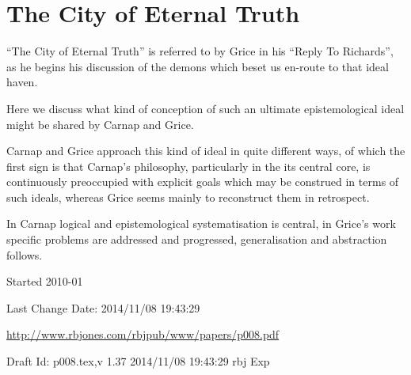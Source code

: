\documentclass[10pt,titlepage]{book}
\begin{document}
\chapter{The City of Eternal Truth}


``The City of Eternal Truth'' is referred to by Grice in his ``Reply To Richards''\cite{grice86b}, as he begins his discussion of the demons which beset us en-route to that ideal haven.

Here we discuss what kind of conception of such an ultimate epistemological ideal might be shared by Carnap and Grice.

Carnap and Grice approach this kind of ideal in quite different ways, of which the first sign is that Carnap's philosophy, particularly in the its central core, is continuously preoccupied with explicit goals which may be construed in terms of such ideals, whereas Grice seems mainly to reconstruct them in retrospect.

In Carnap logical and epistemological systematisation is central, in Grice's work specific problems are addressed and progressed, generalisation and abstraction follows.


\backmatter

%




\label{index}
{\twocolumn[]
{\small\printindex}}

\vfill

\tiny{
Started 2010-01

Last Change $ $Date: 2014/11/08 19:43:29 $ $

\href{http://www.rbjones.com/rbjpub/www/papers/p008.pdf}{http://www.rbjones.com/rbjpub/www/papers/p008.pdf}

Draft $ $Id: p008.tex,v 1.37 2014/11/08 19:43:29 rbj Exp $ $
}%
\end{document}
